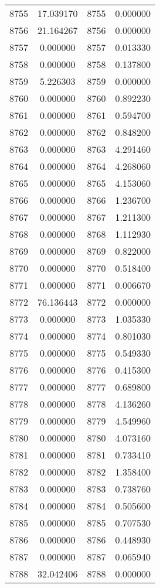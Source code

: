 \documentclass[12pt]{article}
\begin{document}
\begin{longtable}{@{}cccc@{}}
8755 & 17.039170 & 8755 & 0.000000 \\
8756 & 21.164267 & 8756 & 0.000000 \\
8757 & 0.000000 & 8757 & 0.013330 \\
8758 & 0.000000 & 8758 & 0.137800 \\
8759 & 5.226303 & 8759 & 0.000000 \\
8760 & 0.000000 & 8760 & 0.892230 \\
8761 & 0.000000 & 8761 & 0.594700 \\
8762 & 0.000000 & 8762 & 0.848200 \\
8763 & 0.000000 & 8763 & 4.291460 \\
8764 & 0.000000 & 8764 & 4.268060 \\
8765 & 0.000000 & 8765 & 4.153060 \\
8766 & 0.000000 & 8766 & 1.236700 \\
8767 & 0.000000 & 8767 & 1.211300 \\
8768 & 0.000000 & 8768 & 1.112930 \\
8769 & 0.000000 & 8769 & 0.822000 \\
8770 & 0.000000 & 8770 & 0.518400 \\
8771 & 0.000000 & 8771 & 0.006670 \\
8772 & 76.136443 & 8772 & 0.000000 \\
8773 & 0.000000 & 8773 & 1.035330 \\
8774 & 0.000000 & 8774 & 0.801030 \\
8775 & 0.000000 & 8775 & 0.549330 \\
8776 & 0.000000 & 8776 & 0.415300 \\
8777 & 0.000000 & 8777 & 0.689800 \\
8778 & 0.000000 & 8778 & 4.136260 \\
8779 & 0.000000 & 8779 & 4.549960 \\
8780 & 0.000000 & 8780 & 4.073160 \\
8781 & 0.000000 & 8781 & 0.733410 \\
8782 & 0.000000 & 8782 & 1.358400 \\
8783 & 0.000000 & 8783 & 0.738760 \\
8784 & 0.000000 & 8784 & 0.505600 \\
8785 & 0.000000 & 8785 & 0.707530 \\
8786 & 0.000000 & 8786 & 0.448930 \\
8787 & 0.000000 & 8787 & 0.065940 \\
8788 & 32.042406 & 8788 & 0.000000 \\

\end{longtable}
\end{document}
